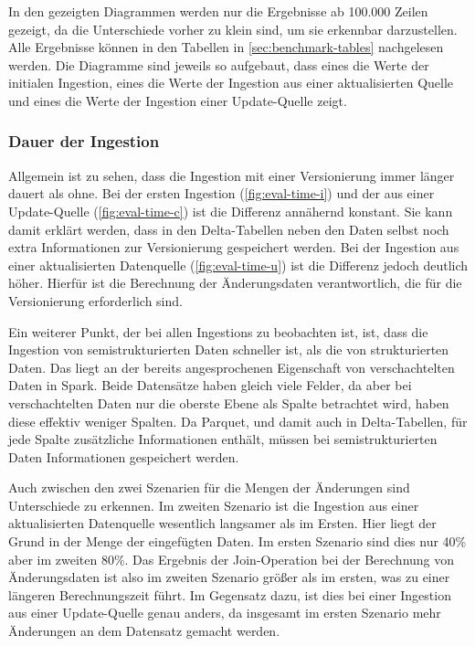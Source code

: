 In den gezeigten Diagrammen werden nur die Ergebnisse ab 100.000 Zeilen gezeigt, da die Unterschiede vorher zu klein sind, um sie erkennbar darzustellen.
Alle Ergebnisse können in den Tabellen in \cref{sec:benchmark-tables} nachgelesen werden.
Die Diagramme sind jeweils so aufgebaut, dass eines die Werte der initialen Ingestion, eines die Werte der Ingestion aus einer aktualisierten Quelle und eines die Werte der Ingestion einer Update-Quelle zeigt.


\subsubsection{Dauer der Ingestion}

Allgemein ist zu sehen, dass die Ingestion mit einer Versionierung immer länger dauert als ohne.
Bei der ersten Ingestion (\cref{fig:eval-time-i}) und der aus einer Update-Quelle (\cref{fig:eval-time-c}) ist die Differenz annähernd konstant.
Sie kann damit erklärt werden, dass in den Delta-Tabellen neben den Daten selbst noch extra Informationen zur Versionierung gespeichert werden.
Bei der Ingestion aus einer aktualisierten Datenquelle (\cref{fig:eval-time-u}) ist die Differenz jedoch deutlich höher.
Hierfür ist die Berechnung der Änderungsdaten verantwortlich, die für die Versionierung erforderlich sind.

Ein weiterer Punkt, der bei allen Ingestions zu beobachten ist, ist, dass die Ingestion von semistrukturierten Daten schneller ist, als die von strukturierten Daten.
Das liegt an der bereits angesprochenen Eigenschaft von verschachtelten Daten in Spark.
Beide Datensätze haben gleich viele Felder, da aber bei verschachtelten Daten nur die oberste Ebene als Spalte betrachtet wird, haben diese effektiv weniger Spalten.
Da Parquet, und damit auch in Delta-Tabellen, für jede Spalte zusätzliche Informationen enthält, müssen bei semistrukturierten Daten Informationen gespeichert werden.

Auch zwischen den zwei Szenarien für die Mengen der Änderungen sind Unterschiede zu erkennen.
Im zweiten Szenario ist die Ingestion aus einer aktualisierten Datenquelle wesentlich langsamer als im Ersten.
Hier liegt der Grund in der Menge der eingefügten Daten.
Im ersten Szenario sind dies nur 40\% aber im zweiten 80\%.
Das Ergebnis der Join-Operation bei der Berechnung von Änderungsdaten ist also im zweiten Szenario größer als im ersten, was zu einer längeren Berechnungszeit führt.
Im Gegensatz dazu, ist dies bei einer Ingestion aus einer Update-Quelle genau anders, da insgesamt im ersten Szenario mehr Änderungen an dem Datensatz gemacht werden.


